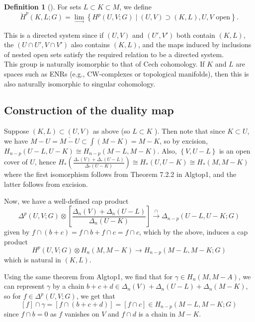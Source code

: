 \documentclass[reqno]{amsart}
\theoremstyle{definition}
\newtheorem{definition}[theorem]{Definition}
\theoremstyle{remark}
\begin{document}
    \begin{definition}[]
        For sets $L \subset K \subset M$, we define
        \[
            \check{H}^{p} (K,L;G) =
            \lim_{\rightarrow} 
            \left\{ H^{p} (U,V;G)  \mid 
            \left( U, V \right) \supset (K, L), U, V
        \text{ open}\right\} .
        \] 
    \end{definition}

    This is a directed system since if
    $\left( U,V \right) $ and
    $\left( U',V' \right) $ both contain $(K,L)$, the
    $\left( U \cap U', V \cap V' \right) $ also contains
    $\left( K, L \right) $, and the maps
    induced by inclusions of nested open sets satisfy the
    required relation to be a directed system.\\

    This group is naturally isomorphic to that of Cech cohomology. If
    $K$ and $L$ are spaces such as ENRs (e.g., CW-complexes or
    topological manifolds), then this is also naturally
    isomorphic to singular cohomology.

    \subsection{Construction of the duality map}
    Suppose $(K, L) \subset (U,V)$ as above (so 
    $L \subset K$ ).
    Then note that since $K \subset U$, we have
    $M - U = \overline{M - U} \subset \int (M - K) = M - K$, so
    by excision,
    $H_{n-p} (U-L, U -K) \cong
    H_{n-p}(M-L, M - K)$.
    Also,
    $\left\{ V, U - L \right\} $ is an open cover of $U$, hence
    $H_* \left( 
    \frac{\Delta_* (V) + \Delta_* (U-L)}{\Delta_* (U - K)}\right) 
    \cong H_* \left( U, U-K \right) \cong
    H_* (M, M-K)$ where the first isomorphism follows
    from Theorem 7.2.2 in Algtop1, and the latter follows
    from excision.


    Now, we have a well-defined cap
    product
    \[
    \Delta^{p} \left( U, V;G \right) \otimes
    \left[ \frac{\Delta_n (V) + \Delta_n (U - L)}{\Delta_n (U-K)} \right] 
    \stackrel{\cap}{\to} \Delta_{n-p} \left( U -L, U-K;G \right) 
    \] 
    given by $f \cap (b+c) = f\cap b+ f \cap c = f \cap c$, which
    by the above, induces a cap product
    \[
    H^{p}(U,V;G) \otimes
    H_n(M, M-K) \to H_{n-p} (M - L, M- K;G)
    \] 
    which is  natural in $(K,L)$.

    Using the same theorem from Algtop1, we find that
    for $\gamma \in H_n (M, M-A)$, we can represent $\gamma$ by
    a chain $b+c+d \in 
    \Delta_n (V) + \Delta_n (U-L) + \Delta_n (M-K)$, so for
    $f \in \Delta^{p}(U,V;G)$, we get that
    \[
    \left[ f \right] \cap \gamma = 
    \left[ f \cap (b + c + d) \right] 
    = \left[ f \cap c \right] \in 
    H_{n-p} (M-L, M-K;G)
    \] 
    since $f \cap b = 0$ as $f$ vanishes on $V$ and
    $f \cap d$ is a chain in $M-K$.
\end{document}
